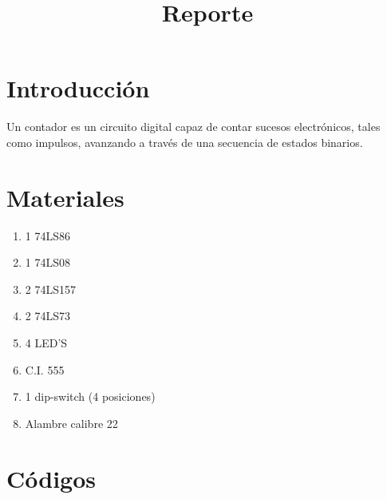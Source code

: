 \documentclass{mylib/reporte}
\title{Reporte}
\begin{document}
\coverPage

\section{Introducción}


Un contador es un circuito digital capaz de
contar sucesos electrónicos, tales como
impulsos, avanzando a través de una
secuencia de estados binarios.

\section{Materiales}

\begin{enumerate}
	\item 1 74LS86
	\item 1 74LS08
	\item 2 74LS157
	\item 2 74LS73
	\item 4 LED'S
	\item C.I. 555
	\item 1 dip-switch (4 posiciones)
	\item Alambre calibre 22
\end{enumerate}

\section{Códigos}
\end{document}
